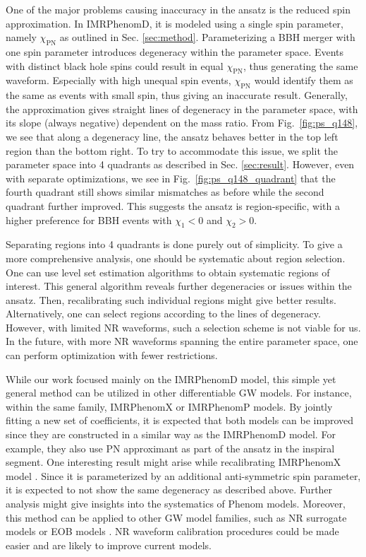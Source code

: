 \documentclass[twocolumn]{aastex631}
\begin{document}
One of the major problems causing inaccuracy in the ansatz is the reduced spin approximation. In IMRPhenomD, it is modeled using a single spin parameter, namely $\chi_{\mathrm{PN}}$ as outlined in Sec. \ref{sec:method}. Parameterizing a BBH merger with one spin parameter introduces degeneracy within the parameter space. Events with distinct black hole spins could result in equal $\chi_{\mathrm{PN}}$, thus generating the same waveform. Especially with high unequal spin events, $\chi_{\mathrm{PN}}$ would identify them as the same as events with small spin, thus giving an inaccurate result. Generally, the approximation gives straight lines of degeneracy in the parameter space, with its slope (always negative) dependent on the mass ratio. From Fig.~\ref{fig:ps_q148}, we see that along a degeneracy line, the ansatz behaves better in the top left region than the bottom right. To try to accommodate this issue, we split the parameter space into 4 quadrants as described in Sec. \ref{sec:result}. However, even with separate optimizations, we see in Fig.~\ref{fig:ps_q148_quadrant} that the fourth quadrant still shows similar mismatches as before while the second quadrant further improved. This suggests the ansatz is region-specific, with a higher preference for BBH events with $\chi_1<0$ and $\chi_2>0$. 

Separating regions into 4 quadrants is done purely out of simplicity. To give a more comprehensive analysis, one should be systematic about region selection. One can use level set estimation algorithms to obtain systematic regions of interest. This general algorithm reveals further degeneracies or issues within the ansatz. Then, recalibrating such individual regions might give better results. Alternatively, one can select regions according to the lines of degeneracy. However, with limited NR waveforms, such a selection scheme is not viable for us. In the future, with more NR waveforms spanning the entire parameter space, one can perform optimization with fewer restrictions. 

While our work focused mainly on the IMRPhenomD model, this simple yet general method can be utilized in other differentiable GW models. For instance, within the same family, IMRPhenomX \cite{pratten2020setting} or IMRPhenomP \cite{hannam2014simple} models. By jointly fitting a new set of coefficients, it is expected that both models can be improved since they are constructed in a similar way as the IMRPhenomD model. For example, they also use PN approximant as part of the ansatz in the inspiral segment. One interesting result might arise while recalibrating IMRPhenomX model \cite{pratten2020setting}. Since it is parameterized by an additional anti-symmetric spin parameter, it is expected to not show the same degeneracy as described above. Further analysis might give insights into the systematics of Phenom models. Moreover, this method can be applied to other GW model families, such as NR surrogate models \cite{varma2019surrogate} or EOB models \cite{taracchini2014effective}. NR waveform calibration procedures could be made easier and are likely to improve current models.
\end{document}
